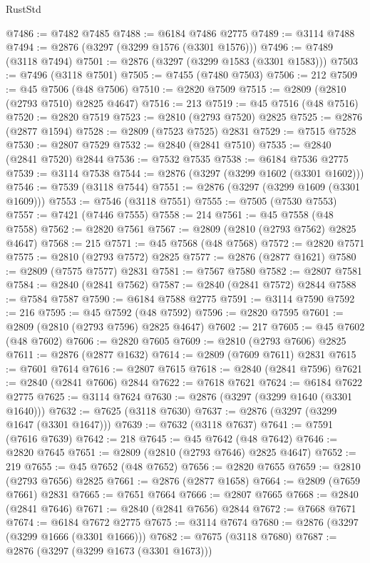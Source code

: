 \begin{lexlean}{RustStd}
\begin{coremodule}
@7486 := @7482 @7485
@7488 := @6184 @7486 @2775
@7489 := @3114 @7488
@7494 := @2876 (@3297 (@3299 @1576 (@3301 @1576)))
@7496 := @7489 (@3118 @7494)
@7501 := @2876 (@3297 (@3299 @1583 (@3301 @1583)))
@7503 := @7496 (@3118 @7501)
@7505 := @7455 (@7480 @7503)
@7506 := 212
@7509 := @45 @7506 (@48 @7506)
@7510 := @2820 @7509
@7515 := @2809 (@2810 (@2793 @7510) @2825 @4647)
@7516 := 213
@7519 := @45 @7516 (@48 @7516)
@7520 := @2820 @7519
@7523 := @2810 (@2793 @7520) @2825
@7525 := @2876 (@2877 @1594)
@7528 := @2809 (@7523 @7525) @2831
@7529 := @7515 @7528
@7530 := @2807 @7529
@7532 := @2840 (@2841 @7510)
@7535 := @2840 (@2841 @7520) @2844
@7536 := @7532 @7535
@7538 := @6184 @7536 @2775
@7539 := @3114 @7538
@7544 := @2876 (@3297 (@3299 @1602 (@3301 @1602)))
@7546 := @7539 (@3118 @7544)
@7551 := @2876 (@3297 (@3299 @1609 (@3301 @1609)))
@7553 := @7546 (@3118 @7551)
@7555 := @7505 (@7530 @7553)
@7557 := @7421 (@7446 @7555)
@7558 := 214
@7561 := @45 @7558 (@48 @7558)
@7562 := @2820 @7561
@7567 := @2809 (@2810 (@2793 @7562) @2825 @4647)
@7568 := 215
@7571 := @45 @7568 (@48 @7568)
@7572 := @2820 @7571
@7575 := @2810 (@2793 @7572) @2825
@7577 := @2876 (@2877 @1621)
@7580 := @2809 (@7575 @7577) @2831
@7581 := @7567 @7580
@7582 := @2807 @7581
@7584 := @2840 (@2841 @7562)
@7587 := @2840 (@2841 @7572) @2844
@7588 := @7584 @7587
@7590 := @6184 @7588 @2775
@7591 := @3114 @7590
@7592 := 216
@7595 := @45 @7592 (@48 @7592)
@7596 := @2820 @7595
@7601 := @2809 (@2810 (@2793 @7596) @2825 @4647)
@7602 := 217
@7605 := @45 @7602 (@48 @7602)
@7606 := @2820 @7605
@7609 := @2810 (@2793 @7606) @2825
@7611 := @2876 (@2877 @1632)
@7614 := @2809 (@7609 @7611) @2831
@7615 := @7601 @7614
@7616 := @2807 @7615
@7618 := @2840 (@2841 @7596)
@7621 := @2840 (@2841 @7606) @2844
@7622 := @7618 @7621
@7624 := @6184 @7622 @2775
@7625 := @3114 @7624
@7630 := @2876 (@3297 (@3299 @1640 (@3301 @1640)))
@7632 := @7625 (@3118 @7630)
@7637 := @2876 (@3297 (@3299 @1647 (@3301 @1647)))
@7639 := @7632 (@3118 @7637)
@7641 := @7591 (@7616 @7639)
@7642 := 218
@7645 := @45 @7642 (@48 @7642)
@7646 := @2820 @7645
@7651 := @2809 (@2810 (@2793 @7646) @2825 @4647)
@7652 := 219
@7655 := @45 @7652 (@48 @7652)
@7656 := @2820 @7655
@7659 := @2810 (@2793 @7656) @2825
@7661 := @2876 (@2877 @1658)
@7664 := @2809 (@7659 @7661) @2831
@7665 := @7651 @7664
@7666 := @2807 @7665
@7668 := @2840 (@2841 @7646)
@7671 := @2840 (@2841 @7656) @2844
@7672 := @7668 @7671
@7674 := @6184 @7672 @2775
@7675 := @3114 @7674
@7680 := @2876 (@3297 (@3299 @1666 (@3301 @1666)))
@7682 := @7675 (@3118 @7680)
@7687 := @2876 (@3297 (@3299 @1673 (@3301 @1673)))

\end{coremodule}
\end{lexlean}
